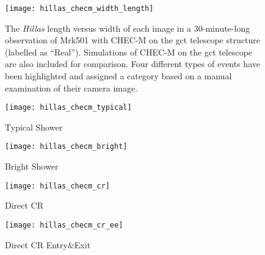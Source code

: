 \begin{figure}
  \texttt{[image: hillas\_checm\_width\_length]}
  \caption[\textit{Hillas} length versus width for an on-sky observation run with CHEC-M.]{The \textit{Hillas} length versus width of each image in a 30-minute-long observation of Mrk501 with CHEC-M on the \gls{gct} telescope structure (labelled as ``Real''). Simulations of CHEC-M on the \gls{gct} telescope are also included for comparison. Four different types of events have been highlighted and assigned a category based on a manual examination of their camera image.}
  \label{fig:hillas_checm_width_length}
\end{figure}

\begin{sidewaysfigure}
  \begin{subfigure}[b]{0.49\textwidth}
    \texttt{[image: hillas\_checm\_typical]}
    \caption{Typical Shower}
    \label{fig:hillas_checm_typical}
  \end{subfigure}
  \hfill
  \begin{subfigure}[b]{0.49\textwidth}
    \texttt{[image: hillas\_checm\_bright]}
    \caption{Bright Shower}
    \label{fig:hillas_checm_bright}
  \end{subfigure}
   \hfill
  \begin{subfigure}[b]{0.49\textwidth}
    \texttt{[image: hillas\_checm\_cr]}
    \caption{Direct CR}
    \label{fig:hillas_checm_cr}
  \end{subfigure}
  \hfill
  \begin{subfigure}[b]{0.49\textwidth}
    \texttt{[image: hillas\_checm\_cr\_ee]}
    \caption{Direct CR Entry\&Exit}
    \label{fig:hillas_checm_cr_ee}
  \end{subfigure}
  \caption[Selection of on-sky images.]{A selection of images taken by \gls{chec-m} during its second on-telescope campaign. The images chosen correspond to the individually highlighted events in Figure~\ref{fig:hillas_checm_width_length}.}
  \label{fig:checm_cherenkov_images}
\end{sidewaysfigure}

